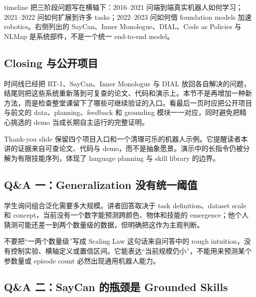 timeline 把三阶段问题写在横轴下：2016--2021 问端到端真实机器人如何学习；2021--2022 问如何扩展到许多 tasks；2022--2023 问如何借 foundation models 加速 robotics。右侧列出的 SayCan、Inner Monologue、DIAL、Code as Policies 与 NLMap 是系统部件，不是一个统一 end-to-end model。


\subsection{Closing 与公开项目}

时间线已经把 RT-1、SayCan、Inner Monologue 与 DIAL 放回各自解决的问题，结尾则把这些系统重新落到可复查的论文、代码和演示上。本节不是再增加一种新方法，而是检查整堂课留下了哪些可继续验证的入口。看最后一页时应把公开项目与前文的 data、planning、feedback 和 grounding 模块一一对应，同时避免把精心挑选的 demo 当成长期自主运行的完整证明。

Thank-you slide 保留四个项目入口和一个清理可乐的机器人示例。它提醒读者本讲的证据来自可查论文、代码与 demo，而不是抽象愿景。演示中的长指令仍被分解为有限技能序列，体现了 language planning 与 skill library 的边界。


\subsection{Q\&A 一：Generalization 没有统一阈值}

学生询问组合泛化需要多大规模。讲者回答取决于 task definition、dataset scale 和 concept，当前没有一个数字能预测跨颜色、物体和技能的 emergence；他个人猜测可能还差一到两个数量级的数据，但明确把这作为主观判断。

\begin{warningbox}{不要把“一两个数量级”写成 Scaling Law}
这句话来自问答中的 rough intuition，没有控制实验、横轴定义或置信区间。它能表达“当前规模仍小”，不能用来预测某个参数量或 episode count 必然出现通用机器人能力。
\end{warningbox}

\subsection{Q\&A 二：SayCan 的瓶颈是 Grounded Skills}

